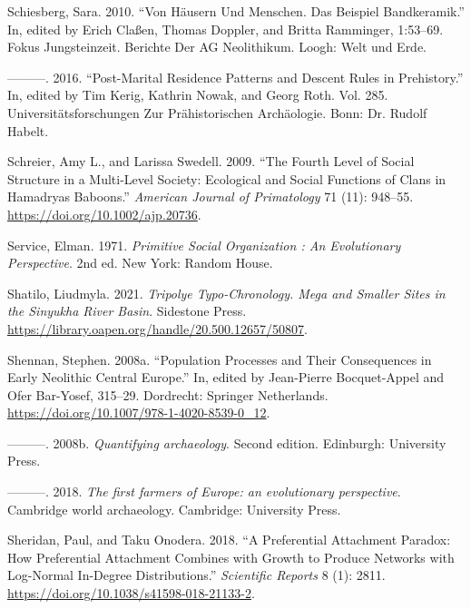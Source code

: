 \documentclass[
  12pt,
  a4paper, twoside]{book}
\newlength{\cslhangindent}
\newlength{\cslentryspacingunit} %
\newenvironment{CSLReferences}[2] %
 {%
  \setlength{\parindent}{0pt}
  \ifodd #1
  \let\oldpar\par
  \def\par{\hangindent=\cslhangindent\oldpar}
  \fi
  \setlength{\parskip}{#2\cslentryspacingunit}
 }%
 {}
\begin{document}
\begin{CSLReferences}{1}{0}
\leavevmode{}%
Schiesberg, Sara. 2010. {``Von Häusern Und Menschen. Das Beispiel Bandkeramik.''} In, edited by Erich Claßen, Thomas Doppler, and Britta Ramminger, 1:53--69. Fokus Jungsteinzeit. Berichte Der AG Neolithikum. Loogh: Welt und Erde.

\leavevmode{}%
---------. 2016. {``Post-Marital Residence Patterns and Descent Rules in Prehistory.''} In, edited by Tim Kerig, Kathrin Nowak, and Georg Roth. Vol. 285. Universitätsforschungen Zur Prähistorischen Archäologie. Bonn: Dr. Rudolf Habelt.

\leavevmode{}%
Schreier, Amy L., and Larissa Swedell. 2009. {``The Fourth Level of Social Structure in a Multi-Level Society: Ecological and Social Functions of Clans in Hamadryas Baboons.''} \emph{American Journal of Primatology} 71 (11): 948--55. \url{https://doi.org/10.1002/ajp.20736}.

\leavevmode{}%
Service, Elman. 1971. \emph{Primitive Social Organization : An Evolutionary Perspective}. 2nd ed. New York: Random House.

\leavevmode{}%
Shatilo, Liudmyla. 2021. \emph{Tripolye Typo-Chronology. Mega and Smaller Sites in the Sinyukha River Basin}. Sidestone Press. \url{https://library.oapen.org/handle/20.500.12657/50807}.

\leavevmode{}%
Shennan, Stephen. 2008a. {``Population Processes and Their Consequences in Early Neolithic Central Europe.''} In, edited by Jean-Pierre Bocquet-Appel and Ofer Bar-Yosef, 315--29. Dordrecht: Springer Netherlands. \url{https://doi.org/10.1007/978-1-4020-8539-0_12}.

\leavevmode{}%
---------. 2008b. \emph{Quantifying archaeology}. Second edition. Edinburgh: University Press.

\leavevmode{}%
---------. 2018. \emph{The first farmers of Europe: an evolutionary perspective}. Cambridge world archaeology. Cambridge: University Press.

\leavevmode{}%
Sheridan, Paul, and Taku Onodera. 2018. {``A Preferential Attachment Paradox: How Preferential Attachment Combines with Growth to Produce Networks with Log-Normal In-Degree Distributions.''} \emph{Scientific Reports} 8 (1): 2811. \url{https://doi.org/10.1038/s41598-018-21133-2}.


\end{CSLReferences}
\end{document}
